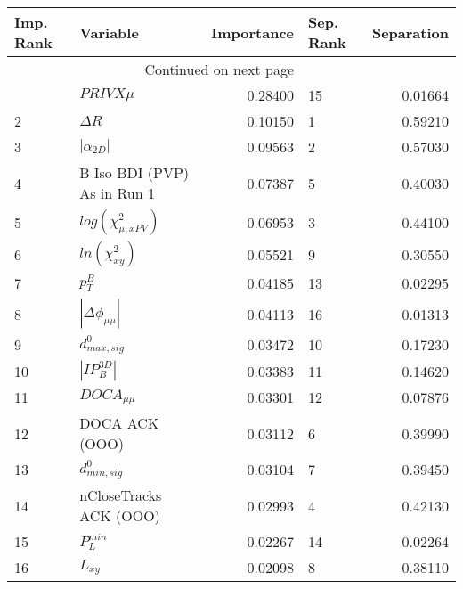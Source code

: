 \usepackage{lscape}

\begin{landscape}
\begin{longtable}{llrlr}
\toprule
Imp. Rank &                     Variable &  Importance & Sep. Rank &  Separation \\
\midrule
\endhead
\midrule
\multicolumn{3}{r}{{Continued on next page}} \\
\midrule
\endfoot

\bottomrule
\endlastfoot
        1 &                   $PRIVX\mu$ &     0.28400 &        15 &     0.01664 \\
        2 &                   $\Delta R$ &     0.10150 &         1 &     0.59210 \\
        3 &              $|\alpha_{2D}|$ &     0.09563 &         2 &     0.57030 \\
        4 &  B Iso BDI (PVP) As in Run 1 &     0.07387 &         5 &     0.40030 \\
        5 &    $log(\chi^{2}_{\mu,xPV})$ &     0.06953 &         3 &     0.44100 \\
        6 &          $ln(\chi^{2}_{xy})$ &     0.05521 &         9 &     0.30550 \\
        7 &                    $p^B_{T}$ &     0.04185 &        13 &     0.02295 \\
        8 &     $|\Delta \phi_{\mu\mu}|$ &     0.04113 &        16 &     0.01313 \\
        9 &             $d^0_{max, sig}$ &     0.03472 &        10 &     0.17230 \\
       10 &              $|IP_{B}^{3D}|$ &     0.03383 &        11 &     0.14620 \\
       11 &              $DOCA_{\mu\mu}$ &     0.03301 &        12 &     0.07876 \\
       12 &               DOCA ACK (OOO) &     0.03112 &         6 &     0.39990 \\
       13 &             $d^0_{min, sig}$ &     0.03104 &         7 &     0.39450 \\
       14 &       nCloseTracks ACK (OOO) &     0.02993 &         4 &     0.42130 \\
       15 &                $P^{min}_{L}$ &     0.02267 &        14 &     0.02264 \\
       16 &                     $L_{xy}$ &     0.02098 &         8 &     0.38110 \\
\end{longtable}

\end{landscape}
